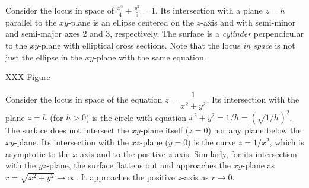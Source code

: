 \begin{example}
	Consider the locus in space of $\displaystyle{\frac{x^2}4 +
	\frac{y^2} 9} = 1$.   Its intersection with a plane $z = h$
	parallel to the $xy$-plane is an ellipse centered on the $z$-axis
	and with semi-minor and semi-major axes  2 and 3, respectively.   The surface
	is a \emph{cylinder} perpendicular to the $xy$-plane with
	elliptical cross sections.
	Note that the locus \emph{in space} is not just the ellipse
	in the $xy$-plane with the same equation.
	
	\begin{center}
	\end{center}
	XXX Figure
\end{example}

\begin{example}
	Consider the locus in space of the equation
	$z = \dfrac 1{x^2 + y^2}$.   Its intersection with the plane $z = h$
	(for $h > 0$) is the circle with equation
	$ x^2 + y^2 = 1/h = (\sqrt{1/h})^2$.   The surface does not intersect
	the $xy$-plane itself ($z = 0$) nor any plane below the $xy$-plane.
	Its intersection with the $xz$-plane ($y = 0$) is the curve
	$z = 1/x^2$, which is asymptotic to the $x$-axis
	and to the positive $z$-axis.  Similarly, for its intersection
	with the $yz$-plane,   the surface flattens out and approaches the
	$xy$-plane as $r = \sqrt{x^2 + y^2} \to \infty$.  It approaches the
	positive $z$-axis as $r \to 0$.


	\begin{center}
	\end{center}
\end{example}

